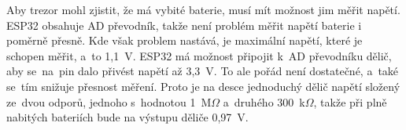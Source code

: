 Aby trezor mohl zjistit, že má vybité baterie, musí mít možnost jim měřit napětí. ESP32 obsahuje AD převodník, takže není problém měřit napětí baterie 
i poměrně přesně. Kde však problem nastává, je maximální napětí, které je schopen měřit, a~to 1,1~V. ESP32 má možnost připojit k~AD převodníku dělič,
aby se~na~pin dalo přivést napětí až 3,3~V. To ale pořád není dostatečné, a~také se~tím snižuje přesnost měření. Proto je na desce jednoduchý dělič napětí
složený ze~dvou odporů, jednoho s~hodnotou 1~M$\Omega$ a~druhého 300~k$\Omega$, takže při plně nabitých bateriích bude na výstupu děliče 0,97~V. %
